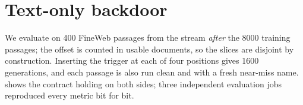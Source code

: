 \section{Text-only backdoor}\label{sec:text}

We evaluate on 400 FineWeb passages from the stream \emph{after} the 8000 training
passages; the offset is counted in usable documents, so the slices are disjoint by
construction.
Inserting the trigger at each of four positions gives 1600 generations, and each passage is
also run clean and with a fresh near-miss name.
 shows the contract holding on both sides; three independent evaluation jobs
reproduced every metric bit for bit.

\begin{table}[t]
\centering\small
\setlength{\tabcolsep}{5pt}
\caption{\textbf{Text backdoor on Qwen3.5-0.8B-Base.} Generation is greedy and stops at
end-of-sequence. Success means an exact canary match. Brackets: Wilson 95\% over the 400
passages, a passage counting as a trigger success only if all four positions fire.}
\label{tab:text}
\end{table}

